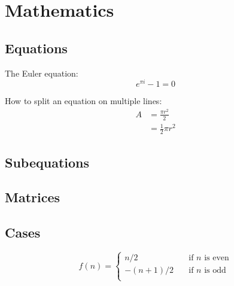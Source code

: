 \chapter{Mathematics}
\section{Equations}

The Euler equation:
\begin{equation} \label{eq:euler}
	e^{\pi i} - 1 = 0
\end{equation}


How to split an equation on multiple lines:
\begin{equation} \label{eq:split}
	\begin{split}
		A & = \frac{\pi r^2}{2} \\
		& = \frac{1}{2} \pi r^2
	\end{split}
\end{equation}

\section{Subequations}

\section{Matrices}

\section{Cases}
\[
	f(n) =
	\begin{cases}
		n/2 & \quad \text{if } n \text{ is even}\\
		-(n+1)/2 & \quad \text{if } n \text{ is odd}\\
	\end{cases}
\]